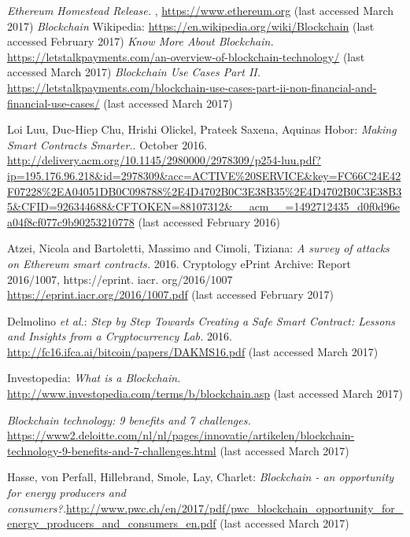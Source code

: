 \begin{thebibliography}{99}
\emph{Ethereum Homestead Release.} , \url{https://www.ethereum.org} (last accessed March 2017)
\emph{Blockchain} Wikipedia: \url{https://en.wikipedia.org/wiki/Blockchain} (last accessed February 2017)
\emph{Know More About Blockchain.} \url{https://letstalkpayments.com/an-overview-of-blockchain-technology/} (last accessed March 2017)
\emph{Blockchain Use Cases Part II.} \url{https://letstalkpayments.com/blockchain-use-cases-part-ii-non-financial-and-financial-use-cases/} (last accessed March 2017)


Loi Luu, Duc-Hiep Chu, Hrishi Olickel, Prateek Saxena, Aquinas Hobor: \emph{Making Smart Contracts Smarter.}. October 2016. \url{http://delivery.acm.org/10.1145/2980000/2978309/p254-luu.pdf?ip=195.176.96.218&id=2978309&acc=ACTIVE\%20SERVICE&key=FC66C24E42F07228\%2EA04051DB0C098788\%2E4D4702B0C3E38B35\%2E4D4702B0C3E38B35&CFID=926344688&CFTOKEN=88107312&__acm__=1492712435_d0f0d96ea04f8cf077c9b90253210778} (last accessed February 2016)

Atzei, Nicola and Bartoletti, Massimo and Cimoli, Tiziana: \emph{A survey of attacks on Ethereum smart contracts.} 2016. Cryptology ePrint Archive: Report 2016/1007, https://eprint. iacr. org/2016/1007 \url{https://eprint.iacr.org/2016/1007.pdf} (last accessed February 2017)


Delmolino \textit{et al.}: \emph{Step by Step Towards Creating a Safe Smart Contract: Lessons and Insights from a Cryptocurrency Lab.} 2016.  \url{http://fc16.ifca.ai/bitcoin/papers/DAKMS16.pdf} (last accessed March 2017)




Investopedia: \emph{What is a Blockchain.} \url{http://www.investopedia.com/terms/b/blockchain.asp} (last accessed March 2017)

\emph{Blockchain technology: 9 benefits and 7 challenges.} \url{https://www2.deloitte.com/nl/nl/pages/innovatie/artikelen/blockchain-technology-9-benefits-and-7-challenges.html} (last accessed March 2017)

Hasse, von Perfall, Hillebrand, Smole, Lay, Charlet: \emph{Blockchain - an opportunity for energy producers and consumers?.}\url{http://www.pwc.ch/en/2017/pdf/pwc_blockchain_opportunity_for_energy_producers_and_consumers_en.pdf} (last accessed March 2017)


\end{thebibliography}
